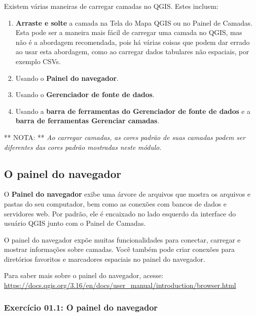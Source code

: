 \documentclass[
  portuguese,
]{krantz}
\providecommand{\tightlist}{%
  \setlength{\itemsep}{0pt}\setlength{\parskip}{0pt}}
\begin{document}
Existem várias maneiras de carregar camadas no QGIS. Estes incluem:

\begin{enumerate}
\def\labelenumi{\arabic{enumi}.}
\tightlist
\item
  \textbf{Arraste e solte} a camada na Tela do Mapa QGIS ou no Painel de Camadas. Esta pode ser a maneira mais fácil de carregar uma camada no QGIS, mas não é a abordagem recomendada, pois há várias coisas que podem dar errado ao usar esta abordagem, como ao carregar dados tabulares não espaciais, por exemplo CSVs.
\item
  Usando o \textbf{Painel do navegador}.
\item
  Usando o \textbf{Gerenciador de fonte de dados}.
\item
  Usando a \textbf{barra de ferramentas do Gerenciador de fonte de dados} e a \textbf{barra de ferramentas Gerenciar camadas}.
\end{enumerate}

** NOTA: ** \emph{Ao carregar camadas, as cores padrão de suas camadas podem ser diferentes das cores padrão mostradas neste módulo.}

\hypertarget{o-painel-do-navegador}{%
\subsection{\texorpdfstring{\textbf{O painel do navegador}}{O painel do navegador}}\label{o-painel-do-navegador}}

O \textbf{Painel do navegador} exibe uma árvore de arquivos que mostra os arquivos e pastas do seu computador, bem como as conexões com bancos de dados e servidores web. Por padrão, ele é encaixado no lado esquerdo da interface do usuário QGIS junto com o Painel de Camadas.

O painel do navegador expõe muitas funcionalidades para conectar, carregar e mostrar informações sobre camadas. Você também pode criar conexões para diretórios favoritos e marcadores espaciais no painel do navegador.

Para saber mais sobre o painel do navegador, acesse: \href{https://docs.qgis.org/3.16/en\%20/docs/user_manual/introduction/browser.html}{https://docs.qgis.org/3.16/en/docs/user\_manual/introduction/browser.html}

\hypertarget{exercuxedcio-01.1-o-painel-do-navegador}{%
\subsubsection{\texorpdfstring{\textbf{Exercício 01.1: O painel do navegador}}{Exercício 01.1: O painel do navegador}}\label{exercuxedcio-01.1-o-painel-do-navegador}}
\end{document}
